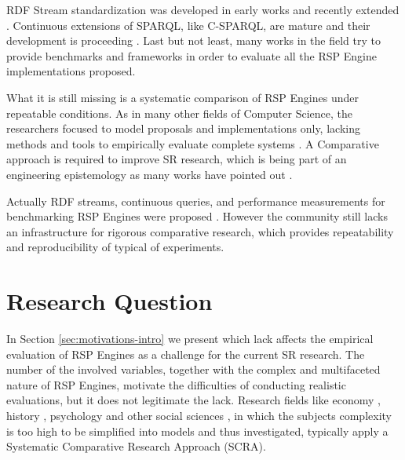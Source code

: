RDF Stream standardization was developed in early works \cite{DBLP:journals/expert/ValleCHF09, Lephuoc2011} and recently extended \cite{DBLP:conf/semweb/BalduiniVDTPC13}. Continuous extensions of SPARQL, like C-SPARQL, are mature and their development is proceeding \cite{Barbieri2010}. Last but not least, many works in the field  \cite{Zhang2012,LePhuoc2012c}  try to provide benchmarks and frameworks in order to evaluate all the RSP Engine implementations proposed. 

What it is still missing is a systematic comparison of RSP Engines under repeatable conditions. As in many other fields of Computer Science, the researchers focused to model proposals and implementations only, lacking methods and tools to empirically evaluate complete systems \cite{Perry:2000:ESS:336512.336586}. A Comparative approach is required to improve SR research, which is being part of an engineering epistemology as many works have pointed out \cite{Tichy:1995:EEC:209090.209093,Wainer:2009:EEC:1518331.1518552}.

Actually RDF streams, continuous queries, and performance measurements for benchmarking RSP Engines were proposed \cite{LePhuoc2012c,Zhang2012, DBLP:conf/semweb/DellAglioCBCV13}. However the community still lacks an infrastructure for rigorous comparative research, which provides repeatability and reproducibility of typical of experiments.


\section{Research Question}\label{sec:research-question-intro}

In Section \ref{sec:motivations-intro} we present which lack affects the empirical evaluation of RSP Engines as a challenge for the current SR research. The number of the involved variables, together with the complex and multifaceted nature of RSP Engines, motivate the difficulties of conducting realistic evaluations, but it does not legitimate the lack. Research fields like economy \cite{CBO9781139174053A009}, history \cite{CSS:4411600}, psychology and other social sciences \cite{felsenstein1985phylogenies}, in which the subjects complexity is too high to be simplified into models and thus investigated, typically apply a Systematic Comparative Research Approach (SCRA).

